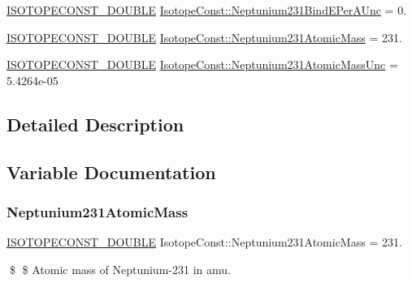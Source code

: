 \begin{DoxyCompactItemize}
\mbox{\hyperlink{group___isotope_const-_macros_ga8f45a7272ce02c0b4c65c44636ed719a}{I\+S\+O\+T\+O\+P\+E\+C\+O\+N\+S\+T\+\_\+\+D\+O\+U\+B\+LE}} \mbox{\hyperlink{group___isotope_const-_neptunium-_np231_gac78ec2ff0258e9d5047518c845cad456}{Isotope\+Const\+::\+Neptunium231\+Bind\+E\+Per\+A\+Unc}} = 0.
\item 
\mbox{\hyperlink{group___isotope_const-_macros_ga8f45a7272ce02c0b4c65c44636ed719a}{I\+S\+O\+T\+O\+P\+E\+C\+O\+N\+S\+T\+\_\+\+D\+O\+U\+B\+LE}} \mbox{\hyperlink{group___isotope_const-_neptunium-_np231_gab4f1f9d2459f2e696be4d63bb8f53fd2}{Isotope\+Const\+::\+Neptunium231\+Atomic\+Mass}} = 231.
\item 
\mbox{\hyperlink{group___isotope_const-_macros_ga8f45a7272ce02c0b4c65c44636ed719a}{I\+S\+O\+T\+O\+P\+E\+C\+O\+N\+S\+T\+\_\+\+D\+O\+U\+B\+LE}} \mbox{\hyperlink{group___isotope_const-_neptunium-_np231_gaa0d09bdd238f0fe5490f9585b1413ac1}{Isotope\+Const\+::\+Neptunium231\+Atomic\+Mass\+Unc}} = 5.\+4264e-\/05
\end{DoxyCompactItemize}


\subsection{Detailed Description}


\subsection{Variable Documentation}
\mbox{\label{group___isotope_const-_neptunium-_np231_gab4f1f9d2459f2e696be4d63bb8f53fd2}} 
\subsubsection{\texorpdfstring{Neptunium231\+Atomic\+Mass}{Neptunium231AtomicMass}}
{\footnotesize\ttfamily \mbox{\hyperlink{group___isotope_const-_macros_ga8f45a7272ce02c0b4c65c44636ed719a}{I\+S\+O\+T\+O\+P\+E\+C\+O\+N\+S\+T\+\_\+\+D\+O\+U\+B\+LE}} Isotope\+Const\+::\+Neptunium231\+Atomic\+Mass = 231.}

\$ \$ Atomic mass of Neptunium-\/231 in amu. \mbox{\label{group___isotope_const-_neptunium-_np231_gaa0d09bdd238f0fe5490f9585b1413ac1}} 
